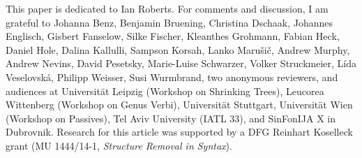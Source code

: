 \documentclass[output=paper]{langsci/langscibook}
\begin{document}
This paper is dedicated to Ian Roberts.  For comments and discussion, I am
grateful to  Johanna Benz, Benjamin Bruening, Christina Dschaak, Johannes
Eng\-lisch, Gisbert Fanselow, Silke Fischer, Kleanthes Grohmann, Fabian Heck,
Daniel Hole, Dalina Kallulli, Sampson Korsah,  Lanko Maru\v{s}i\v{c}, Andrew
Murphy,  Andrew Nevins, David Pesetsky, Marie-Luise Schwarzer, Volker
Struckmeier,  L\'ida Veselovsk\'a,   Philipp Weisser, Susi Wurmbrand, two
anonymous reviewers, and audiences at Universität Leipzig (Workshop on
Shrinking Trees), Leucorea Wittenberg (Workshop on Genus Verbi),
Universität Stuttgart, Universität Wien (Workshop on Passives), Tel Aviv
University (IATL 33), and SinFonIJA X in Dubrovnik.  Research for this article
was supported by a DFG Reinhart Koselleck grant (MU 1444/14-1, {\itshape Structure
Removal in Syntax}).

{\sloppy
\printbibliography[heading=subbibliography,notkeyword=this]
}
\end{document}
